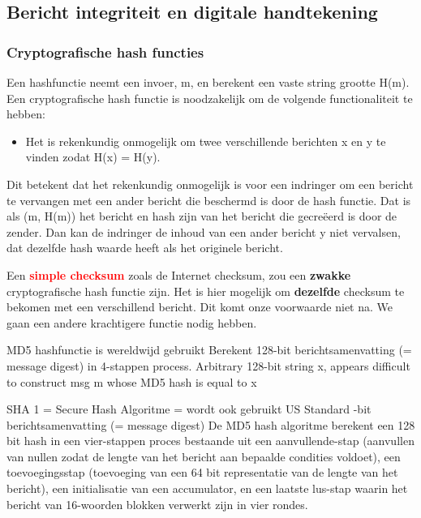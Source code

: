 \subsection{Bericht integriteit en digitale handtekening}
\subsubsection{Cryptografische hash functies}

Een hashfunctie neemt een invoer, m, en berekent een vaste string grootte H(m). Een cryptografische hash functie is noodzakelijk om de volgende functionaliteit te hebben:
\begin{itemize}
\item Het is rekenkundig onmogelijk om twee verschillende berichten x en y te vinden zodat H(x) = H(y).
\end{itemize}

\noindent Dit betekent dat het rekenkundig onmogelijk is voor een indringer om een bericht te vervangen met een ander bericht die beschermd is door de hash functie. Dat is als (m, H(m)) het bericht en hash zijn van het bericht die gecreëerd is door de zender. Dan kan de indringer de inhoud van een ander bericht y niet vervalsen, dat dezelfde hash waarde heeft als het originele bericht.

\noindent Een \textcolor{red}{\textbf{simple checksum}} zoals de Internet checksum, zou een \textbf{zwakke} cryptografische hash functie zijn. Het is hier mogelijk om \textbf{dezelfde} checksum te bekomen met een verschillend bericht. Dit komt onze voorwaarde niet na. We gaan een andere krachtigere functie nodig hebben.


\bi
\itf MD5 hashfunctie is wereldwijd gebruikt
    \bi
    \itf Berekent 128-bit berichtsamenvatting (= message digest) in 4-stappen process.
    \itf Arbitrary 128-bit string x, appears difficult to construct msg m whose MD5 hash is equal to x
    \ei

\itf SHA 1 = Secure Hash Algoritme = wordt ook gebruikt
    \bi
    \itf US Standard
    -bit berichtsamenvatting (= message digest)
    \ei
\ei
De MD5 hash algoritme berekent een 128 bit hash in een vier-stappen proces bestaande uit een aanvullende-stap (aanvullen van nullen zodat de lengte van het bericht aan bepaalde condities voldoet), een toevoegingsstap (toevoeging van een 64 bit representatie van de lengte van het bericht), een initialisatie van een accumulator, en een laatste lus-stap waarin het bericht van 16-woorden blokken verwerkt zijn in vier rondes.

